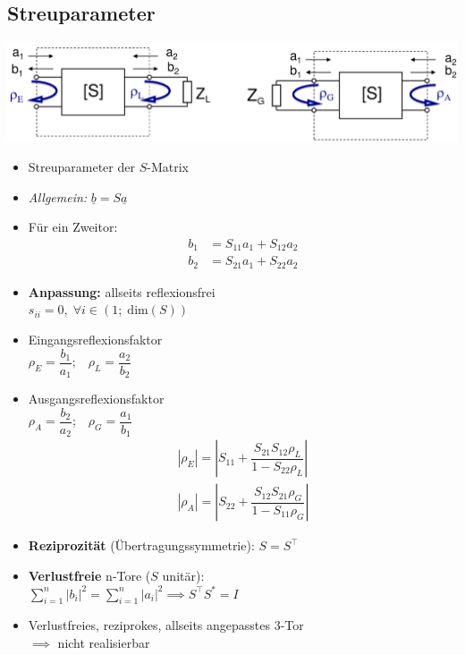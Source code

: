 \subsection{Streuparameter}
\includegraphics[width=0.35\paperheight]{content/fuw/pictures/hf_zweitor_reflektion.png}
\begin{itemize}
    \itemsep0pt
    \item Streuparameter der $S$-Matrix
    \item \textit{Allgemein:} \(\underline{b} = S \underline{a}\)
    \item Für ein Zweitor:
    \begin{align*}
        b_1 &= S_{11} a_1 + S_{12} a_2\\
        b_2 &= S_{21} a_1 + S_{22} a_2
    \end{align*}
    \item \textbf{Anpassung:} allseits reflexionsfrei\\
        \(s_{ii} = 0, \;\forall i \in (1;\; \mathrm{dim}(S))\)
    \item Eingangsreflexionsfaktor\\
        \(\rho_E = \dfrac{b_1}{a_1}; \;\;\; \rho_L = \dfrac{a_2}{b_2}\)
    \item Ausgangsreflexionsfaktor\\
        \(\rho_A = \dfrac{b_2}{a_2}; \;\;\; \rho_G = \dfrac{a_1}{b_1}\)
        \begin{align*}
            |\rho_E| = \left|S_{11} + \dfrac{S_{21} S_{12} \rho_L}{1 - S_{22} \rho_L}\right|\\
            |\rho_A| = \left|S_{22} + \dfrac{S_{12} S_{21} \rho_G}{1 - S_{11} \rho_G}\right|
        \end{align*}
    \item \textbf{Reziprozität} (Übertragungssymmetrie): \(S = S^\top\)
    \item \textbf{Verlustfreie} n-Tore ($S$ unitär):\\
        \(\sum^n_{i=1} |b_i|^2 = \sum^n_{i=1} |a_i|^2 \implies S^\top S^* = I\)
    \item Verlustfreies, reziprokes, allseits angepasstes 3-Tor\\
        \(\implies\) nicht realisierbar
\end{itemize}
